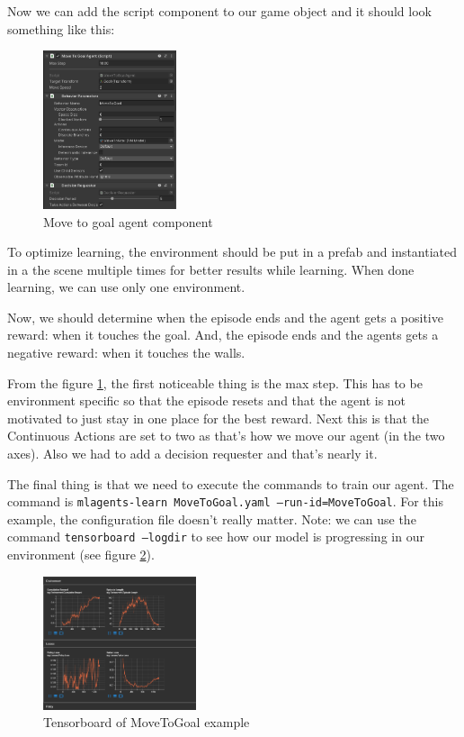\documentclass[a4paper, 12pt]{book}
\begin{document}
Now we can add the script component to our game object and it should look something like this:
\begin{figure}[h]
\begin{center}
\includegraphics[width=0.35\textwidth]{Images/movetogoalcomponent.png}
\end{center}
\caption{Move to goal agent component}
\label{pic9}
\end{figure}

To optimize learning, the environment should be put in a prefab and instantiated in a the scene multiple times for better results while learning. When done learning, we can use only one environment.

Now, we should determine when the episode ends and the agent gets a positive reward: when it touches the goal. 
And, the episode ends and the agents gets a negative reward: when it touches the walls.

From the figure \ref{pic9}, the first noticeable thing is the max step. This has to be environment specific so that the episode resets and that the agent is not motivated to just stay in one place for the best reward. Next this is that the Continuous Actions are set to two as that's how we move our agent (in the two axes). Also we had to add a decision requester and that's nearly it.

The final thing is that we need to execute the commands to train our agent.  The command is \texttt{mlagents-learn MoveToGoal.yaml --run-id=MoveToGoal}. For this example, the configuration file doesn't really matter. Note: we can use the command \texttt{tensorboard --logdir} to see how our model is progressing in our environment (see figure \ref{pic10}).

\begin{figure}[ht]
\begin{center}
\includegraphics[width=0.4\textwidth]{Images/tensorboard.png}
\end{center}
\caption{Tensorboard of MoveToGoal example}
\label{pic10}
\end{figure}
\end{document}
